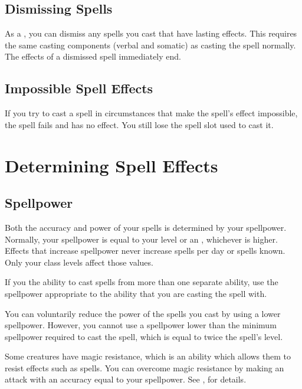     \subsection{Dismissing Spells}

        As a , you can dismiss any spells you cast that have lasting effects.
        This requires the same casting components (verbal and somatic) as casting the spell normally.
        The effects of a dismissed spell immediately end.

    \subsection{Impossible Spell Effects}
        If you try to cast a spell in circumstances that make the spell's effect impossible, the spell fails and has no effect.
        You still lose the spell slot used to cast it.

\section{Determining Spell Effects}

    \subsection{Spellpower}

        Both the accuracy and power of your spells is determined by your spellpower.
        Normally, your spellpower is equal to your level or an , whichever is higher.
        Effects that increase spellpower never increase spells per day or spells known.
        Only your class levels affect those values.

         If you the ability to cast spells from more than one separate ability, use the spellpower appropriate to the ability that you are casting the spell with.

         You can voluntarily reduce the power of the spells you cast by using a lower spellpower.
        However, you cannot use a spellpower lower than the minimum spellpower required to cast the spell, which is equal to twice the spell's level.

         Some creatures have magic resistance, which is an ability which allows them to resist  effects such as spells.
        You can overcome magic resistance by making an attack with an accuracy equal to your spellpower.
        See , for details.

